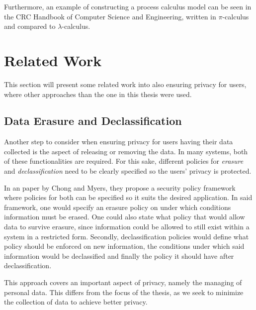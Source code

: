 Furthermore, an example of constructing a process calculus model can be seen in the CRC Handbook of Computer Science and Engineering\cite{pierce1997foundational}, written in $\pi$-calculus and compared to $\lambda$-calculus. %

\section{Related Work}

This section will present some related work into also ensuring privacy for users, where other approaches than the one in this thesis were used.

\subsection{Data Erasure and Declassification}



Another step to consider when ensuring privacy for users having their data collected is the aspect of releasing or removing the data. In many systems, both of these functionalities are required. For this sake, different policies for \textit{erasure} and \textit{declassification} need to be clearly specified so the users' privacy is protected. 


In an paper by Chong and Myers\cite{chong2005language}, they propose a security policy framework where policies for both can be specified so it suits the desired application. In said framework, one would specify an erasure policy on under which conditions information must be erased. One could also state what policy that would allow data to survive erasure, since information could be allowed to still exist within a system in a restricted form. Secondly, declassification policies would define what policy should be enforced on new information, the conditions under which said information would be declassified and finally the policy it should have after declassification. 


This approach covers an important aspect of privacy, namely the managing of personal data. This differs from the focus of the thesis, as we seek to minimize the collection of data to achieve better privacy. %

